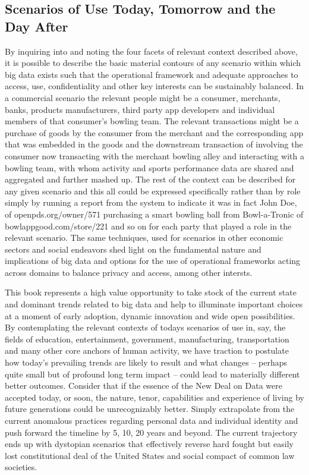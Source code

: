  \subsection{Scenarios of Use Today, Tomorrow and the Day After}

By inquiring into and noting the four facets of relevant context described above, it is possible to describe the basic material contours of any scenario within which big data exists such that the operational framework and adequate approaches to access, use, confidentiality and other key interests can be sustainably balanced. In a commercial scenario the relevant people might be a consumer, merchants, banks, products manufacturers, third party app developers and individual members of that consumer’s bowling team. The relevant transactions might be a purchase of goods by the consumer from the merchant and the corresponding app that was embedded in the goods and the downstream transaction of involving the consumer now transacting with the merchant bowling alley and interacting with a bowling team, with whom activity and sports performance data are shared and aggregated and further mashed up. The rest of the context can be described for any given scenario and this all could be expressed specifically rather than by role simply by running a report from the system to indicate it was in fact John Doe, of openpds.org/owner/571 purchasing a smart bowling ball from Bowl-a-Tronic of bowlappgood.com/store/221 and so on for each party that played a role in the relevant scenario. The same techniques, used for scenarios in other economic sectors and social endeavors shed light on the fundamental nature and implications of big data and options for the use of operational frameworks acting across domains to balance privacy and access, among other intersts.

This book represents a high value opportunity to take stock of the current state and dominant trends related to big data and help to illuminate important choices at a moment of early adoption, dynamic innovation and wide open possibilities. By contemplating the relevant contexts of todays scenarios of use in, say, the fields of education, entertainment, government, manufacturing, transportation and many other core anchors of human activity, we have traction to postulate how today’s prevailing trends are likely to result and what changes – perhaps quite small but of profound long term impact – could lead to materially different better outcomes. Consider that if the essence of the New Deal on Data were accepted today, or soon, the nature, tenor, capabilities and experience of living by future generations could be unrecognizably better. Simply extrapolate from the current anomalous practices regarding personal data and individual identity and push forward the timeline by 5, 10, 20 years and beyond. The current trajectory ends up with dystopian scenarios that effectively reverse hard fought but easily lost constitutional deal of the United States and social compact of common law societies.

